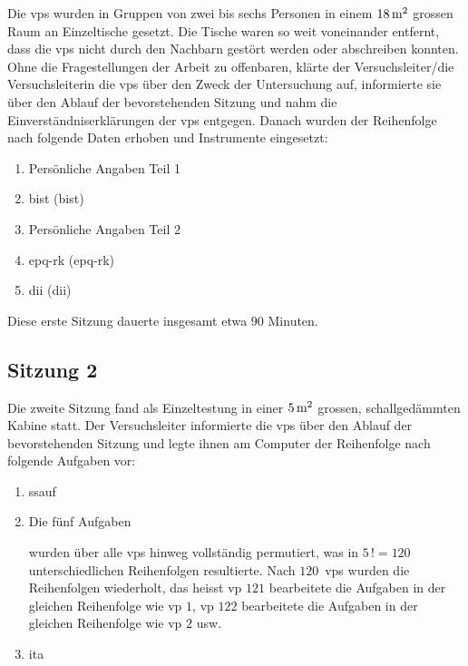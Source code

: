 \documentclass[11pt, twoside, a4paper]{book}		%
\begin{document}
Die \glspl{vp} wurden in Gruppen von zwei bis sechs Personen in einem $18\,\textnormal{m}^2$ grossen Raum an Einzeltische gesetzt. Die Tische waren so weit voneinander entfernt, dass die \glspl{vp} nicht durch den Nachbarn gestört werden oder abschreiben konnten. 
Ohne die Fragestellungen der Arbeit zu offenbaren, klärte der Versuchsleiter/die Versuchsleiterin die \glspl{vp} über den Zweck der Untersuchung auf, informierte sie über den Ablauf der bevorstehenden Sitzung und nahm die Einverständniserklärungen der \glspl{vp} entgegen. Danach wurden der Reihenfolge nach folgende Daten erhoben und Instrumente eingesetzt:

\begin{enumerate}
	\item Persönliche Angaben Teil 1
	\item \acrlong{bist} (\gls{bist})
	\item Persönliche Angaben Teil 2
	\item \acrlong{epq-rk} (\gls{epq-rk})
	\item \acrlong{dii} (\gls{dii})
\end{enumerate}

\noindent Diese erste Sitzung dauerte insgesamt etwa 90 Minuten.

\subsection{Sitzung 2}
Die zweite Sitzung fand als Einzeltestung in einer $5\,\textnormal{m}^2$ grossen, schallgedämmten Kabine statt. 
Der Versuchsleiter informierte die \glspl{vp} über den Ablauf der bevorstehenden Sitzung und legte ihnen am Computer der Reihenfolge nach folgende Aufgaben vor:

\begin{enumerate}
	\item	\gls{ssauf}
	\item	Die fünf Aufgaben
			wurden über alle \glspl{vp} hinweg vollständig permutiert, was in $5\,! = 120$ unterschiedlichen Reihenfolgen resultierte. Nach $120$~\glspl{vp} wurden die Reihenfolgen wiederholt, das heisst  \gls{vp} $121$ bearbeitete die Aufgaben in der gleichen Reihenfolge wie \gls{vp} $1$, \gls{vp} $122$ bearbeitete die Aufgaben in der gleichen Reihenfolge wie \gls{vp} $2$ usw.
	\item	\gls{ita}
\end{enumerate}
\end{document}
